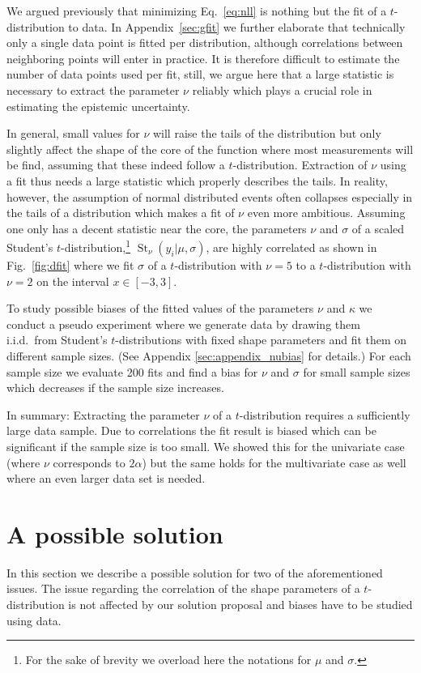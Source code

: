 \documentclass{article}
\begin{document}
We argued previously that minimizing Eq.~\eqref{eq:nll} is nothing but the fit of a $t$-distribution to data.
In Appendix~\ref{sec:gfit} we further elaborate that technically only a single data point is fitted per distribution, although correlations between neighboring points will enter in practice.
It is therefore difficult to estimate the number of data points used per fit, still, we argue here that a large statistic is necessary to extract the parameter $\nu$ reliably which plays a crucial role in estimating the epistemic uncertainty.

In general, small values for $\nu$ will raise the tails of the distribution but only slightly affect the shape of the core of the function where most measurements will be find, assuming that these indeed follow a $t$-distribution.
Extraction of $\nu$ using a fit thus needs a large statistic which properly describes the tails.
In reality, however, the assumption of normal distributed events often collapses especially in the tails of a distribution which makes a fit of $\nu$ even more ambitious.
Assuming one only has a decent statistic near the core, the parameters $\nu$ and $\sigma$ of a scaled Student's $t$-distribution,\footnote{For the sake of brevity we overload here the notations for $\mu$ and $\sigma$.} $\operatorname{St}_\nu(y_i | \mu, \sigma)$, are highly correlated as shown in Fig.~\ref{fig:dfit} where we fit $\sigma$ of a $t$-distribution with $\nu=5$ to a $t$-distribution with $\nu=2$ on the interval $x \in [-3, 3]$.

To study possible biases of the fitted values of the parameters $\nu$ and $\kappa$ we conduct a pseudo experiment where we generate data by drawing them i.i.d.\ from Student's $t$-distributions with fixed shape parameters and fit them on different sample sizes.
(See Appendix \ref{sec:appendix_nubias} for details.)
For each sample size we evaluate 200 fits and find a bias for $\nu$ and $\sigma$ for small sample sizes which decreases if the sample size increases.

In summary: Extracting the parameter $\nu$ of a $t$-distribution requires a sufficiently large data sample.
Due to correlations the fit result is biased which can be significant if the sample size is too small.
We showed this for the univariate case (where $\nu$ corresponds to $2\alpha$) but the same holds for the multivariate case as well where an even larger data set is needed.

\section{A possible solution}
\label{sec:solution}
In this section we describe a possible solution for two of the aforementioned issues.
The issue regarding the correlation of the shape parameters of a $t$-distribution is not affected by our solution proposal and biases have to be studied using data.
\end{document}
